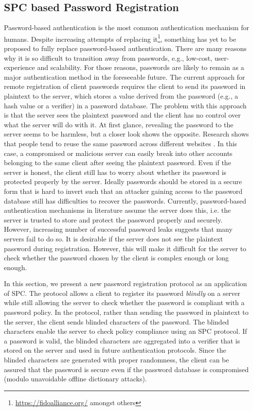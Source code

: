 \subsection{SPC based Password Registration}\label{sec:protocol}

Password-based authentication is the most common authentication mechanism for humans. Despite increasing attempts of replacing it\footnote{\url{https://fidoalliance.org/} amongst others}, something has yet to be proposed to fully replace password-based authentication. 
There are many reasons why it is so difficult to transition away from passwords, e.g., low-cost, user-experience and scalability. For those reasons, passwords are likely to remain as a major authentication method in the foreseeable future. 
The current approach for remote registration of client passwords requires the client to send its password in plaintext to the server, which stores a value derived from the password (e.g., a hash value or a verifier) in a password database. 
The problem with this approach is that the server sees the plaintext password and the client has no control over what the server will do with it. 
At first glance, revealing the password to the server seems to be harmless, but a closer look shows the opposite. Research shows that people tend to reuse the same password across different websites \cite{Florencio2007,Gaw2006,das14}. 
In this case, a compromised or malicious server can easily break into other accounts belonging to the same client after seeing the plaintext password. 
Even if the server is honest, the client still has to worry about whether its password is protected properly by the server. 
Ideally passwords should be stored in a secure form that is hard to invert such that an attacker gaining access to the password database still has difficulties to recover the passwords. 
Currently, password-based authentication mechanisms in literature assume the server does this, i.e. the server is trusted to store and protect the password properly and securely. 
However, increasing number of successful password leaks \cite{cupidBreach,rockyouBreach,adobeBreach} suggests that many servers fail to do so. It is desirable if the server does not see the plaintext password during registration. However, this will make it difficult for the server to check whether the password chosen by the client is complex enough or long enough.  

In this section, we present a new password registration protocol as an application of SPC. 
The protocol allows a client to register its password \emph{blindly} on a server while still allowing the server to check whether the password is compliant with a password policy. 
In the protocol, rather than sending the password in plaintext to the server, the client sends blinded characters of the password. 
The blinded characters enable the server to check policy compliance using an SPC protocol. 
If a password is valid, the blinded characters are aggregated into a verifier that is stored on the server and used in future authentication protocols. 
Since the blinded characters are generated with proper randomness, the client can be assured that the password is secure even if the password database is compromised (modulo unavoidable offline dictionary attacks).

